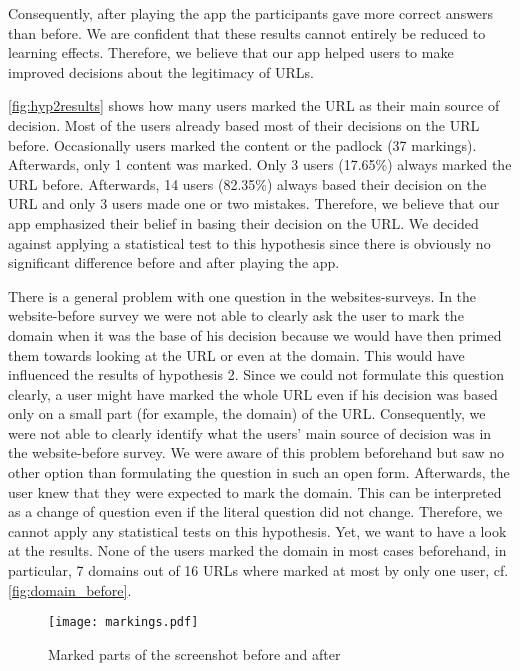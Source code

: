 \begin{description}[leftmargin=0cm]
Consequently, after playing the app the participants gave more correct answers than before.
We are confident that these results cannot entirely be reduced to learning effects.
Therefore, we believe that our app helped users to make improved decisions about the legitimacy of URLs.
\item[Hypothesis 2:]
\autoref{fig:hyp2results} shows how many users marked the URL as their main source of decision.
Most of the users already based most of their decisions on the URL before.
Occasionally users marked the content or the padlock (37 markings).
Afterwards, only 1 content was marked.
Only 3 users (17.65\%) always marked the URL before.
Afterwards, 14 users (82.35\%) always based their decision on the URL and only 3 users made one or two mistakes.
Therefore, we believe that our app emphasized their belief in basing their decision on the URL.
We decided against applying a statistical test to this hypothesis since there is obviously no significant difference before and after playing the app.
\item[Hypothesis 3:]
There is a general problem with one question in the websites-surveys.
In the website-before survey we were not able to clearly ask the user to mark the domain when it was the base of his decision because we would have then primed them towards looking at the URL or even at the domain.
This would have influenced the results of hypothesis 2.
Since we could not formulate this question clearly, a user might have marked the whole URL even if his decision was based only on a small part (for example, the domain) of the URL.
Consequently, we were not able to clearly identify what the users' main source of decision was in the website-before survey.
We were aware of this problem beforehand but saw no other option than formulating the question in such an open form.
Afterwards, the user knew that they were expected to mark the domain.
This can be interpreted as a change of question even if the literal question did not change.
Therefore, we cannot apply any statistical tests on this hypothesis.
Yet, we want to have a look at the results.
None of the users marked the domain in most cases beforehand, in particular, 7 domains out of 16 URLs where marked at most by only one user, cf. \autoref{fig:domain_before}.
\begin{figure}
\centering
\texttt{[image: markings.pdf]}
\caption{Marked parts of the screenshot before and after}
\label{fig:markings}
\end{figure}


\end{description}
